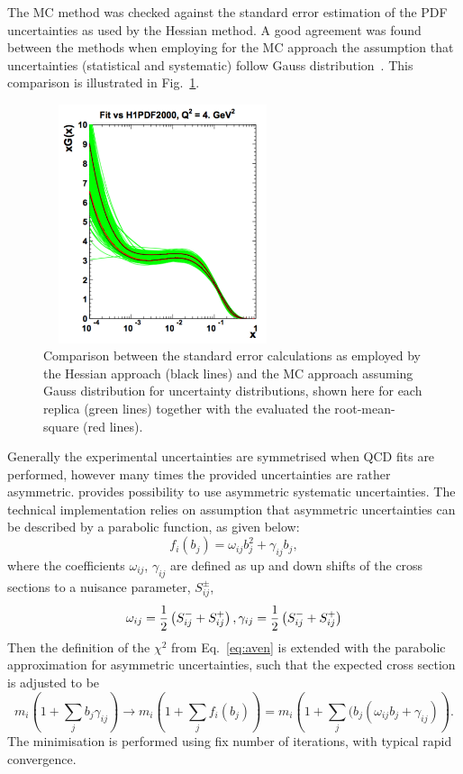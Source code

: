 \begin{description}
The MC method was checked against the standard error estimation of the PDF uncertainties as used by the Hessian method. 
A good agreement was found between the methods when employing for the MC approach the assumption that uncertainties 
(statistical and systematic) follow Gauss distribution~\cite{hera-lhc:report2009}. 
This comparison is illustrated in Fig.~\ref{fig:mchessian}.
\begin{figure}[!ht]
 \centering
  \includegraphics[width=7cm,height=7cm]{mchessian.pdf}
  \caption{Comparison between the standard error calculations as employed by the Hessian approach (black lines) 
      and the MC approach assuming Gauss distribution for uncertainty distributions, shown here for each replica 
          (green lines) together with the evaluated the root-mean-square (red lines).}
  \label{fig:mchessian}        
\end{figure}

Generally the experimental uncertainties are symmetrised when QCD fits 
are performed, however many times the provided uncertainties are rather asymmetric.
\fitter provides possibility to use asymmetric systematic uncertainties.
The technical implementation relies on assumption that 
asymmetric uncertainties can be described by a parabolic function, as given below:
\begin{equation}
  f_i(b_j)=\omega_{ij}b_j^2 + \gamma_{ij}b_j,
\end{equation}
where the coefficients $\omega_{ij}$, $\gamma_{ij}$ are defined as 
up and down shifts of the cross sections to a nuisance parameter, $S_{ij}^{\pm}$, 
\begin{equation}
  \omega_{ij}=\frac{1}{2}\left(S_{ij}^{-}+S_{ij}^{+}\right), \\
  \gamma_{ij}=\frac{1}{2}\left(S_{ij}^{-}+S_{ij}^{+}\right) 
\end{equation}
Then the definition of the $\chi^2$ from Eq.~\ref{eq:aven} is extended with the parabolic approximation 
for asymmetric uncertainties, such that the expected cross section is adjusted to be
\begin{equation}
  m_i(1+\sum_j b_j\gamma_{ij}) \to m_i\left(1+\sum_{j}f_i(b_j)\right) = m_i\left(1+\sum_j(b_j(\omega_{ij}b_j + \gamma_{ij})\right).
\end{equation}
The minimisation is performed using ﬁx number of iterations, with typical rapid convergence.


\end{description}


